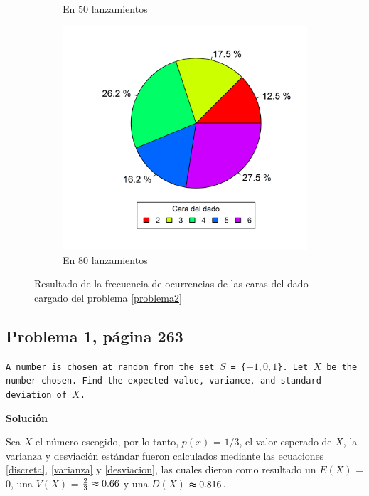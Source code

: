\documentclass{article}
\begin{document}
\begin{figure}[h]
\begin{center}
\begin{subfigure}{0.32\textwidth}
        \caption{En $50$ lanzamientos}
    \end{subfigure}
    \begin{subfigure}{0.32\textwidth}
        \includegraphics[width=.99\linewidth]{Figures/dados80-.png}
        \caption{En $80$ lanzamientos}
    \end{subfigure}
    \caption{Resultado de la frecuencia de ocurrencias de las caras del dado cargado del problema \ref{problema2}}
    \label{dados1}
    \end{center}
\end{figure}

\subsection{Problema 1, página 263} \label{problema4}
\texttt{A number is chosen at random from the set $S$ = \{$-1, 0, 1$\}. Let $X$ be the number chosen. Find the expected value, variance, and standard deviation of $X$.}

\noindent \textbf{Solución}

\noindent Sea $X$ el número escogido, por lo tanto, $p(x)$ = $1/3$, el valor esperado de $X$, la varianza y desviación estándar fueron calculados mediante las ecuaciones \ref{discreta}, \ref{varianza} y \ref{desviacion}, las cuales dieron como resultado un $E{(X)}$ = $0$, una $V{(X)}$ = $\frac{2}{3} \thickapprox 0.66$ y una $D{(X)}$ $\thickapprox 0.816$.
\end{document}
